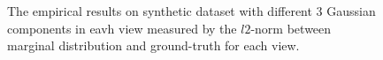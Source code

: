 \documentclass[11pt]{article}
\begin{document}
\begin{figure}
\caption{The empirical results on synthetic dataset with different 3 Gaussian components in eavh view measured by the $l2$-norm between marginal distribution and ground-truth for each view.}
\end{figure}
\end{document}
